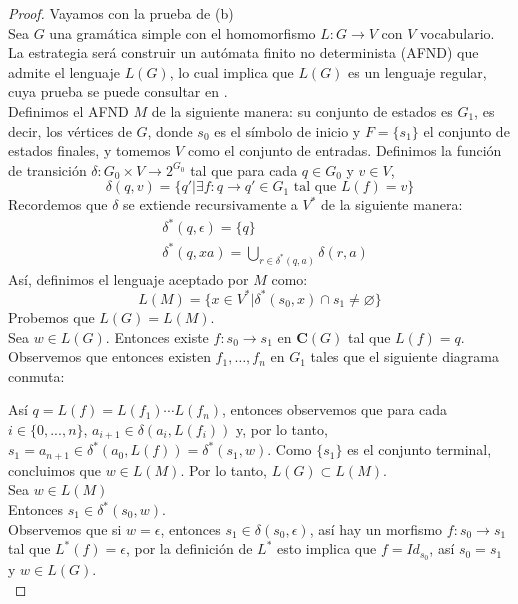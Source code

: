\documentclass[../main.tex]{subfiles}
\begin{document}
\begin{proof}
 	Vayamos con la prueba de (b) \\
 	Sea $G$ una gramática simple con el homomorfismo $L: G \to V$ con $V$ vocabulario. \\
    La estrategia será construir un autómata finito no determinista (AFND) que admite el lenguaje $L(G)$, lo cual implica que $L(G)$ es un lenguaje regular, cuya prueba se puede consultar en \cite{hopcroft01}. \\
 	Definimos el AFND $M$ de la siguiente manera: su conjunto de estados es $G_1$, es decir, los vértices de $G$, donde $s_0$ es el símbolo de inicio y $F=\{s_1\}$ el conjunto de estados finales, y tomemos $V$ como el conjunto de entradas. Definimos la función de transición $\delta : G_0 \times V \to 2^{G_0}$ tal que para cada $q \in G_0$ y $v\in V$, 
 	\[
 		\delta (q,v) = \{q'|\exists f: q \to q' \in G_1 \text{ tal que }L(f)=v \}
 	\]
 	Recordemos que $\delta$ se extiende recursivamente a $V^*$ de la siguiente manera:
 	\begin{align*}
 		&\delta ^* (q, \epsilon) = \{ q \} \\
 		&\delta ^* (q, xa) = \bigcup_{r \in \delta ^* (q,a)} \delta (r,a)
 	\end{align*}
	Así, definimos el lenguaje aceptado por $M$ como:
	\[
		L(M)=\{x \in V^* | \delta ^* (s_0, x) \cap {s_1} \neq \varnothing \}
	\]
 	Probemos que $L(G)=L(M)$. \\
 	Sea $w \in L(G)$. Entonces existe $f:s_0 \to s_1$ en $\mathbf{C}(G)$ tal que $L(f)=q$. Observemos que entonces existen $f_1, \dots, f_n$ en $G_1$ tales que el siguiente diagrama conmuta: 
 	\begin{center}
	\end{center}
 	Así $q=L(f)=L(f_1) \cdots L(f_n)$, entonces observemos que para cada $i\in \{0, ..., n\}$, $a_{i+1} \in \delta (a_i, L(f_i))$ y, por lo tanto, $s_1=a_{n+1} \in \delta ^*  (a_0, L(f))=\delta ^*  (s_1, w)$. Como $\{s_1\}$ es el conjunto terminal, concluimos que $w \in L(M)$.  Por lo tanto, $L(G) \subset L(M)$. \\
 	Sea $w \in L(M)$ \\
 	Entonces $s_1 \in \delta ^* (s_0, w)$. \\
 	Observemos que si $w= \epsilon$, entonces $s_1 \in \delta (s_0, \epsilon)$, así hay un morfismo $f:s_0 \to s_1$ tal que $L^*(f)= \epsilon$, por la definición de $L^*$ esto implica que $f=Id_{s_0}$, así $s_0=s_1$ y $w \in L(G)$. \\ 

\end{proof}
\end{document}
